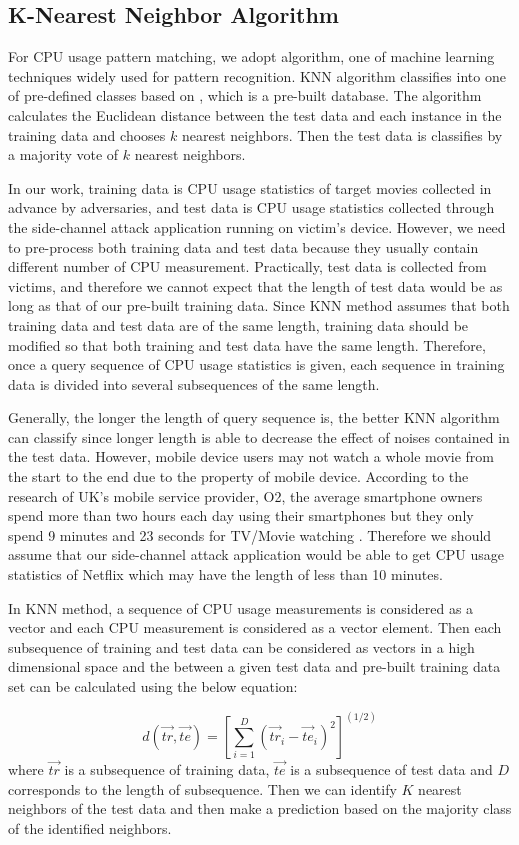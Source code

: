 \subsection{K-Nearest Neighbor Algorithm}
\label{sec:knn} 

For CPU usage pattern matching, we adopt  algorithm, one of machine learning techniques widely used for pattern recognition.
KNN algorithm classifies   into one of pre-defined classes based on , which is a pre-built database. 
The algorithm calculates the Euclidean distance between the test data and each instance in the training data and chooses $k$ nearest neighbors.
Then the test data is classifies by a majority vote of $k$ nearest neighbors. 

In our work, training data is CPU usage statistics of target movies collected in advance by adversaries, and test data is CPU usage statistics collected through the side-channel attack application running on victim's device. 
However, we need to pre-process both training data and test data because they usually contain different number of CPU measurement.
Practically, test data is collected from victims, and therefore we cannot expect that the length of test data would be as long as that of our pre-built training data. 
Since KNN method assumes that both training data and test data are of the same length, training data should be modified so that both training and test data have the same length.
Therefore, once a query sequence of CPU usage statistics is given, each sequence in training data is divided into several subsequences of the same length. 

Generally, the longer the length of query sequence is, the better KNN algorithm can classify since longer length is able to decrease the effect of noises contained in the test data.
However, mobile device users may not watch a whole movie from the start to the end due to the property of mobile device.
According to the research of UK's mobile service provider, O2, the average smartphone owners spend more than two hours each day using their smartphones but they only spend 9 minutes and 23 seconds for TV/Movie watching \cite{O2:2012}.
Therefore we should assume that our side-channel attack application would be able to get CPU usage statistics of Netflix which may have the length of less than 10 minutes.

In KNN method, a sequence of CPU usage measurements is considered as a vector and each CPU measurement is considered as a vector element. 
Then each subsequence of training and test data can be considered as vectors in a high dimensional space and the  between a given test data and pre-built training data set can be calculated using the below equation: 

\[
d( \vec{tr}, \vec{te} ) = [ \sum_{i=1}^{D} (\vec{tr}_i - \vec{te}_i)^2  ]^{(1/2)}
\]
where $\vec{tr}$ is a subsequence of training data, $\vec{te}$ is a subsequence of test data and $D$ corresponds to the length of subsequence. 
Then we can identify $K$ nearest neighbors of the test data and then make a prediction based on the majority class of the identified neighbors. 

